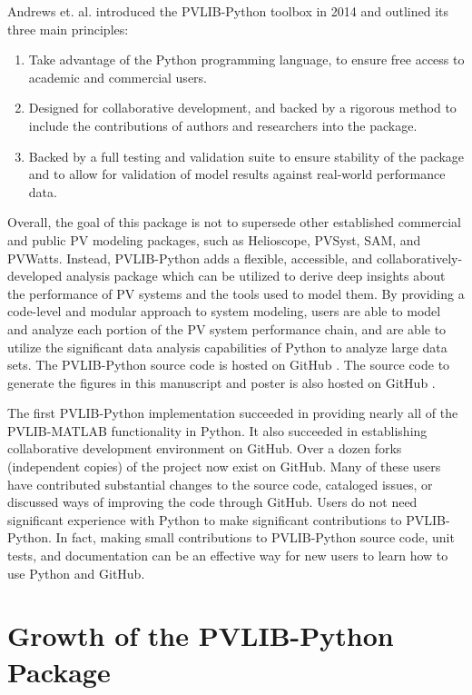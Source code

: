 \documentclass[conference]{IEEEtran}
\begin{document}
Andrews et. al. \cite{andrews} introduced the PVLIB-Python toolbox in 2014 and outlined its three main principles:

\begin{enumerate}
\item Take advantage of the Python programming language, to ensure free access to academic and commercial users.
\item Designed for collaborative development, and backed by a rigorous method to include the contributions of authors and researchers into the package.
\item Backed by a full testing and validation suite to ensure stability of the package and to allow for validation of model results against real-world performance data.
\end{enumerate}

Overall, the goal of this package is not to supersede other established commercial and public PV modeling packages, such as Helioscope, PVSyst, SAM, and PVWatts. 
Instead, PVLIB-Python adds a flexible, accessible, and collaboratively-developed analysis package which can be utilized to derive deep insights about the performance of PV systems and the tools used to model them.
By providing a code-level and modular approach to system modeling, users are able to model and analyze each portion of the PV system performance chain, and are able to utilize the significant data analysis capabilities of Python to analyze large data sets.
The PVLIB-Python source code is hosted on GitHub \cite{pvlib-github}.
The source code to generate the figures in this manuscript and poster is also hosted on GitHub \cite{pvlib-pvsc2015-github}.

The first PVLIB-Python implementation \cite{sandia-github} succeeded in providing nearly all of the PVLIB-MATLAB functionality in Python.
It also succeeded in establishing collaborative development environment on GitHub. 
Over a dozen forks (independent copies) of the project now exist on GitHub. 
Many of these users have contributed substantial changes to the source code, cataloged issues, or discussed ways of improving the code through GitHub.
Users do not need significant experience with Python to make significant contributions to PVLIB-Python.
In fact, making small contributions to PVLIB-Python source code, unit tests, and documentation can be an effective way for new users to learn how to use Python and GitHub.


\section{Growth of the PVLIB-Python Package}
\end{document}
